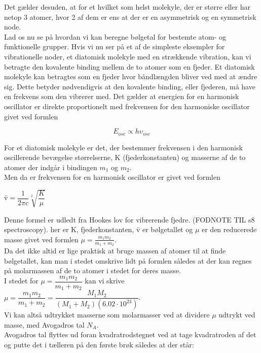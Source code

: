 Det gælder desuden, at for et hvilket som helst molekyle, der er større eller har netop 3 atomer, hvor 2 af dem er ens at der er en asymmetrisk og en symmetrisk node. 
\\
Lad os nu se på hvordan vi kan beregne bølgetal for bestemte atom- og funktionelle grupper. Hvis vi nu ser på et af de simpleste eksempler for vibrationelle noder, et diatomisk molekyle med en strækkende vibration, kan vi betragte den kovalente binding mellem de to atomer som en fjeder. Et diatomisk molekyle kan betragtes som en fjeder hvor båndlængden bliver ved med at ændre sig. Dette betyder nødvendigvis at den kovalente binding, eller fjederen, må have en frekvens som den vibrerer med. Det gælder at energien for en harmonisk oscillator er direkte proportionelt med frekvensen for den harmoniske oscillator givet ved formlen

\begin{center}
\begin{equation}
E_{osc} \propto h \upsilon_{osc}
\end{equation}
\end{center}

For et diatomisk molekyle er det, der bestemmer frekvensen i den harmonisk oscillerende bevægelse størrelserne, K (fjederkonstanten) og masserne af de to atomer der indgår i bindingen $m_1$ og $m_2$.
\\
Men da er frekvensen for en harmonisk oscillator er givet ved formlen

\begin{center}
\={v}$= \dfrac{1}{2 \pi c} \sqrt[2]{\dfrac{K}{\mu}}$
\end{center}

Denne formel er udledt fra Hookes lov for vibrerende fjedre. (FODNOTE TIL s8 spectroscopy). her er K, fjederkonstanten, \={v} er bølgetallet og $\mu$ er den reducerede masse givet ved formlen $\mu = \frac{m_1 m_2}{m_1 + m_2}$. 
\\
Da det ikke altid er lige praktisk at bruge massen af atomer til at finde bølgetallet, kan man i stedet omskrive lidt på formlen således at der kan regnes på molarmassen af de to atomer i stedet for deres masse.
\\
I stedet for $\mu = \dfrac{m_1 m_2}{m_1 + m_2}$ kan vi skrive $\mu = \dfrac{m_1 m_2}{m_1 + m_2} = \dfrac{M_1 M_2}{(M_1 + M_2 ) (6.02 \cdot 10^{23})}$. 
\\
Vi kan altså udtrykket masserne som molarmasser ved at dividere $\mu$ udtrykt ved masse, med Avogadros tal $N_A$.
\\
Avogadros tal flyttes ud foran kvadratrodstegnet ved at tage kvadratroden af det og putte det i tælleren på den første brøk således at der står:


